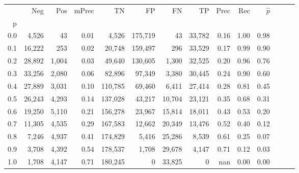 \begin{tabular}{rrrrrrrrrrrrrr}
\toprule
{} &     Neg &    Pos & mPrec &       TN &       FP &      FN &      TP &  Prec &   Rec & $\hat{p}$ \\
p   &         &        &       &          &          &         &         &       &       &           \\
\midrule
0.0 &   4,526 &     43 &  0.01 &    4,526 &  175,719 &      43 &  33,782 &  0.16 &  1.00 &      0.98 \\
0.1 &  16,222 &    253 &  0.02 &   20,748 &  159,497 &     296 &  33,529 &  0.17 &  0.99 &      0.90 \\
0.2 &  28,892 &  1,004 &  0.03 &   49,640 &  130,605 &   1,300 &  32,525 &  0.20 &  0.96 &      0.76 \\
0.3 &  33,256 &  2,080 &  0.06 &   82,896 &   97,349 &   3,380 &  30,445 &  0.24 &  0.90 &      0.60 \\
0.4 &  27,889 &  3,031 &  0.10 &  110,785 &   69,460 &   6,411 &  27,414 &  0.28 &  0.81 &      0.45 \\
0.5 &  26,243 &  4,293 &  0.14 &  137,028 &   43,217 &  10,704 &  23,121 &  0.35 &  0.68 &      0.31 \\
0.6 &  19,250 &  5,110 &  0.21 &  156,278 &   23,967 &  15,814 &  18,011 &  0.43 &  0.53 &      0.20 \\
0.7 &  11,305 &  4,535 &  0.29 &  167,583 &   12,662 &  20,349 &  13,476 &  0.52 &  0.40 &      0.12 \\
0.8 &   7,246 &  4,937 &  0.41 &  174,829 &    5,416 &  25,286 &   8,539 &  0.61 &  0.25 &      0.07 \\
0.9 &   3,708 &  4,392 &  0.54 &  178,537 &    1,708 &  29,678 &   4,147 &  0.71 &  0.12 &      0.03 \\
1.0 &   1,708 &  4,147 &  0.71 &  180,245 &        0 &  33,825 &       0 &   nan &  0.00 &      0.00 \\
\bottomrule
\end{tabular}
